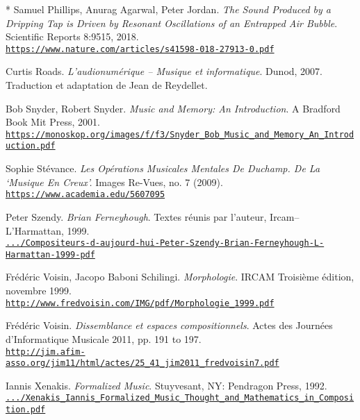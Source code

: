 \begin{thebibliography}{99}
	* Samuel Phillips,  Anurag Agarwal, Peter Jordan. \textit{The Sound Produced by a Dripping Tap is Driven by Resonant Oscillations of an Entrapped Air Bubble}. Scientific Reports 8:9515, 2018.\\ 
	\href{https://www.nature.com/articles/s41598-018-27913-0}{\scriptsize{\texttt{https://www.nature.com/articles/s41598-018-27913-0.pdf}}} \normalsize{}
	
	Curtis Roads. \textit{L'audionum\'{e}rique -- Musique et informatique}. Dunod, 2007. Traduction et adaptation de Jean de Reydellet.
	
	Bob Snyder, Robert Snyder. \textit{Music and Memory: An Introduction}. A Bradford Book
Mit Press, 2001.\\ 
	\href{https://monoskop.org/images/f/f3/Snyder\_Bob\_Music\_and\_Memory\_An\_Introduction.pdf}{\scriptsize{\texttt{https://monoskop.org/images/f/f3/Snyder\_Bob\_Music\_and\_Memory\_An\_Introduction.pdf}}} \normalsize{}
	
	Sophie St\'{e}vance. \textit{Les Op\'{e}rations Musicales Mentales De Duchamp. De La `Musique En Creux'.} Images Re-Vues, no. 7 (2009). \\ 
	\href{https://www.academia.edu/5607095}{\scriptsize{\texttt{https://www.academia.edu/5607095}}} \normalsize{}
	
	Peter Szendy. \textit{Brian Ferneyhough}. Textes r\'{e}unis par l'auteur, Ircam--L'Har\-mattan, 1999.\\ 
	\href{https://www.scribd.com/document/365564172/Compositeurs-d-aujourd-hui-Peter-Szendy-Brian-Ferneyhough-L-Harmattan-1999-pdf}{\scriptsize{\texttt{.../Compositeurs-d-aujourd-hui-Peter-Szendy-Brian-Ferneyhough-L-Harmattan-1999-pdf}}} \normalsize{}
			
	Fr\'{e}d\'{e}ric Voisin, Jacopo Baboni Schilingi. \textit{Morphologie}. IRCAM Troisi\`{e}me \'{e}dition, novembre 1999.\\ 
	\href{http://www.fredvoisin.com/IMG/pdf/Morphologie\_1999.pdf}{\scriptsize{\texttt{http://www.fredvoisin.com/IMG/pdf/Morphologie\_1999.pdf}}} \normalsize{}
	
	Fr\'{e}d\'{e}ric Voisin. \textit{Dissemblance et espaces compositionnels}. Actes des Journ\'{e}es d’Informatique Musicale 2011, pp. 191 to 197.\\ 
	\href{http://jim.afim-asso.org/jim11/html/actes/25\_41\_jim2011\_fredvoisin7.pdf}{\scriptsize{\texttt{http://jim.afim-asso.org/jim11/html/actes/25\_41\_jim2011\_fredvoisin7.pdf}}} \normalsize{}

	Iannis Xenakis. \textit{Formalized Music}. Stuyvesant, NY: Pendragon Press, 1992.\\ 
	\href{https://monoskop.org/images/7/74/Xenakis\_Iannis\_Formalized\_Music\_Thought\_and\_Mathematics\_in\_Composition.pdf}{\scriptsize{\texttt{.../Xenakis\_Iannis\_Formalized\_Music\_Thought\_and\_Mathematics\_in\_Composition.pdf}}} \normalsize{}

\end{thebibliography}